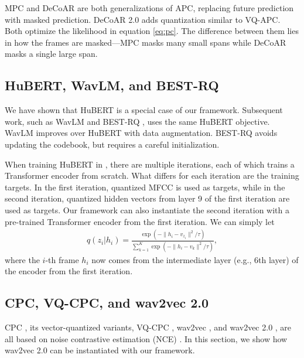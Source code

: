 \documentclass[11pt,a4paper]{article}
\begin{document}
MPC \citep{jiang2019improving,zhang2021transformer} and DeCoAR \citep{9053176} are both generalizations of APC,
replacing future prediction with masked prediction.
DeCoAR 2.0 \citep{ling2020decoar} adds quantization similar to VQ-APC.
Both optimize the likelihood in equation \ref{eq:pc}.
The difference between them lies in how the frames are masked---MPC masks many small spans while DeCoAR masks a single large span.

\subsection{HuBERT, WavLM, and BEST-RQ}
\label{sec:hubert-variants}

We have shown that HuBERT is a special case of our framework.
%
%
Subsequent work, such as WavLM \citep{chen2022wavlm} and BEST-RQ \citep{chiu2022self}, uses the same HuBERT objective.
WavLM improves over HuBERT with data augmentation.
BEST-RQ avoids updating the codebook, but requires a careful initialization.

When training HuBERT in \citet{hsu2021hubert}, there are multiple iterations, each of which trains a Transformer encoder from scratch.
What differs for each iteration are the training targets.
In the first iteration, quantized MFCC is used as targets, while in the second iteration, quantized hidden vectors from layer 9 of the first iteration are used as targets.
Our framework can also instantiate the second iteration with a pre-trained Transformer encoder from the first iteration. 
We can simply let
\begin{align}
    q(z_i|h_i) = \frac{\exp\left(-\|h_i - v_{z_i}\|^2 / \tau\right)} 
  {\sum_{k=1}^{K} \exp\left(-\|h_i - v_k\|^2 / \tau\right)},
\label{eq:softmax-q-iter2}
\end{align}
where the $i$-th frame $h_i$ now comes from the intermediate layer (e.g., 6th layer) of
the encoder from the first iteration.

\subsection{CPC, VQ-CPC, and wav2vec 2.0}
\label{sec:wav2vec}

%
%
%
%
%
%
CPC \citep{oord2018representation}, its vector-quantized variants, VQ-CPC \citep{niekerk2020vector}, 
wav2vec \citep{schneider2019wav2vec}, and wav2vec 2.0 \citep{baevski2020wav2vec}, 
are all based on noise contrastive estimation (NCE) \citep{smith-eisner-2005-contrastive,pmlr-v9-gutmann10a}.
%
%
%
%
%
In this section, we show how wav2vec 2.0 can be instantiated with our framework.
\end{document}
